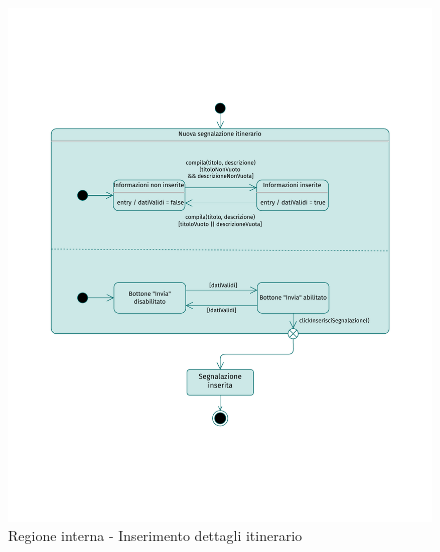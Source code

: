 \documentclass{natourDoc}
\begin{document}
\newpage
\begin{figure}[!htbp]
	\centering
	\includegraphics[width=\textwidth, page=3]{./diagrams/statechart.pdf}
	\caption{Regione interna - Inserimento dettagli itinerario}
\end{figure}
\FloatBarrier
\end{document}
